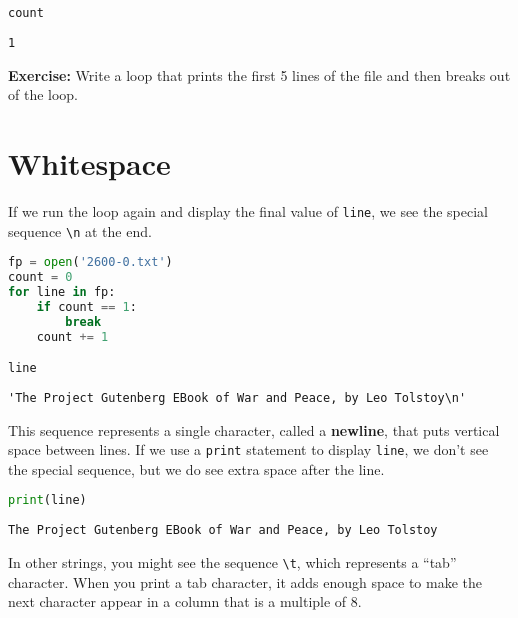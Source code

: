 \begin{lstlisting}[language=Python,style=source]
count
\end{lstlisting}

\begin{lstlisting}[style=output]
1
\end{lstlisting}

\textbf{Exercise:} Write a loop that prints the first 5 lines of the
file and then breaks out of the loop.

\hypertarget{whitespace}{%
\section{Whitespace}\label{whitespace}}

If we run the loop again and display the final value of
\passthrough{\lstinline!line!}, we see the special sequence
\passthrough{\lstinline!\\n!} at the end.

\begin{lstlisting}[language=Python,style=source]
fp = open('2600-0.txt')
count = 0
for line in fp:
    if count == 1:
        break
    count += 1

line
\end{lstlisting}

\begin{lstlisting}[style=output]
'The Project Gutenberg EBook of War and Peace, by Leo Tolstoy\n'
\end{lstlisting}

This sequence represents a single character, called a \textbf{newline},
that puts vertical space between lines. If we use a
\passthrough{\lstinline!print!} statement to display
\passthrough{\lstinline!line!}, we don't see the special sequence, but
we do see extra space after the line.

\begin{lstlisting}[language=Python,style=source]
print(line)
\end{lstlisting}

\begin{lstlisting}[style=output]
The Project Gutenberg EBook of War and Peace, by Leo Tolstoy
\end{lstlisting}

In other strings, you might see the sequence
\passthrough{\lstinline!\\t!}, which represents a ``tab'' character.
When you print a tab character, it adds enough space to make the next
character appear in a column that is a multiple of 8.

